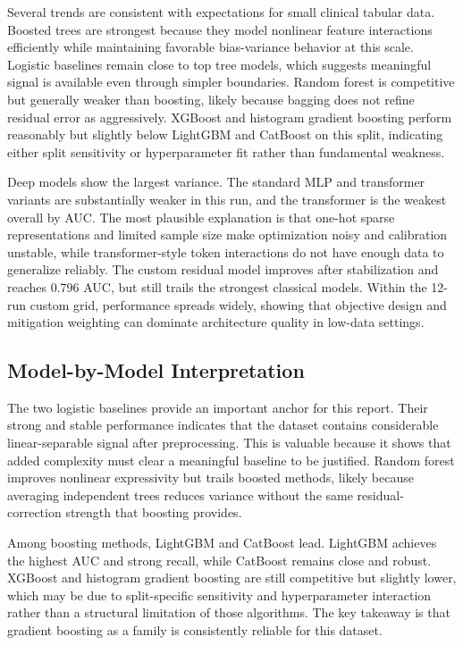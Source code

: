 ﻿\documentclass[11pt]{article}
\begin{document}
Several trends are consistent with expectations for small clinical tabular data. Boosted trees are strongest because they model nonlinear feature interactions efficiently while maintaining favorable bias-variance behavior at this scale. Logistic baselines remain close to top tree models, which suggests meaningful signal is available even through simpler boundaries. Random forest is competitive but generally weaker than boosting, likely because bagging does not refine residual error as aggressively. XGBoost and histogram gradient boosting perform reasonably but slightly below LightGBM and CatBoost on this split, indicating either split sensitivity or hyperparameter fit rather than fundamental weakness.

Deep models show the largest variance. The standard MLP and transformer variants are substantially weaker in this run, and the transformer is the weakest overall by AUC. The most plausible explanation is that one-hot sparse representations and limited sample size make optimization noisy and calibration unstable, while transformer-style token interactions do not have enough data to generalize reliably. The custom residual model improves after stabilization and reaches 0.796 AUC, but still trails the strongest classical models. Within the 12-run custom grid, performance spreads widely, showing that objective design and mitigation weighting can dominate architecture quality in low-data settings.

\subsection{Model-by-Model Interpretation}
The two logistic baselines provide an important anchor for this report. Their strong and stable performance indicates that the dataset contains considerable linear-separable signal after preprocessing. This is valuable because it shows that added complexity must clear a meaningful baseline to be justified. Random forest improves nonlinear expressivity but trails boosted methods, likely because averaging independent trees reduces variance without the same residual-correction strength that boosting provides.

Among boosting methods, LightGBM and CatBoost lead. LightGBM achieves the highest AUC and strong recall, while CatBoost remains close and robust. XGBoost and histogram gradient boosting are still competitive but slightly lower, which may be due to split-specific sensitivity and hyperparameter interaction rather than a structural limitation of those algorithms. The key takeaway is that gradient boosting as a family is consistently reliable for this dataset.
\end{document}
